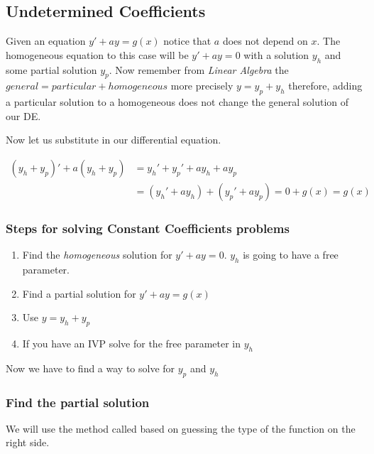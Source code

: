 \subsection{Undetermined Coefficients}

Given an equation \(y' + ay = g(x)\) notice that \(a\) does not depend on \(x\).
The homogeneous equation to this case will be \(y' + ay = 0\) with a solution \(y_h\) and some
partial solution \(y_p\). Now remember from \emph{Linear Algebra} the 
\(general = particular + homogeneous\) more precisely \(y = y_p + y_h\) therefore, adding a 
particular solution to a homogeneous does not change
the general solution of our DE.

Now let us substitute in our differential equation.

\begin{align*}
    (y_h + y_p)' + a(y_h + y_p) &= y_h' + y_p' + ay_h + ay_p\\   
    &= (y_h' + ay_h) + (y_p' + ay_p) = 0 + g(x) = g(x) 
\end{align*}

\subsubsection{Steps for solving Constant Coefficients problems}

\begin{enumerate}

    \item Find the \emph{homogeneous} solution for \(y' + ay = 0\). \(y_h\) is going
          to have a free parameter.
    
    \item Find a partial solution for \(y' + ay = g(x)\)
    
    \item Use \(y = y_h + y_p\)
    
    \item If you have an IVP solve for the free parameter in \(y_h\)

\end{enumerate}

Now we have to find a way to solve for \(y_p\) and \(y_h\)

\subsubsection{Find the partial solution}

We will use the method called based on guessing the type of the function on the right side.

